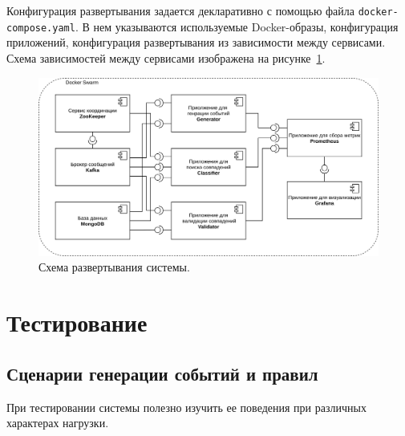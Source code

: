 \documentclass[14pt]{article}
\begin{document}
Конфигурация развертывания задается декларативно с помощью файла  \verb|docker-compose.yaml|. В нем указываются используемые Docker-образы, конфигурация приложений, конфигурация развертывания из зависимости между сервисами. Схема зависимостей между сервисами изображена на рисунке~\ref{fig:deployment}.

\begin{figure}[h]
    \centering
    \includegraphics[width=1\textwidth]{images/arch/deployment.png}
    \caption{Схема развертывания системы.}
    \label{fig:deployment}
\end{figure}

\section{Тестирование}
\label{section:testing}

\subsection{Сценарии генерации событий и правил}
\label{section:generationScenarios}
При тестировании системы полезно изучить ее поведения при различных характерах нагрузки. 
\end{document}

